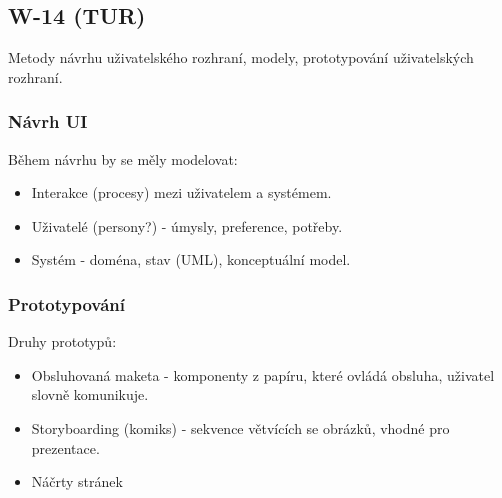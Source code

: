 \subsection{W-14 (TUR)}
Metody návrhu uživatelského rozhraní, modely, prototypování uživatelských rozhraní.

\subsubsection*{Návrh UI}

Během návrhu by se měly modelovat:
\begin{itemize}
  \item Interakce (procesy) mezi uživatelem a systémem. 
  \item Uživatelé (persony?) - úmysly, preference, potřeby.
  \item Systém - doména, stav (UML), konceptuální model.
\end{itemize}

\subsubsection*{Prototypování}

Druhy prototypů:
\begin{itemize}
  \item Obsluhovaná maketa - komponenty z papíru, které ovládá obsluha, uživatel slovně komunikuje.
  \item Storyboarding (komiks) - sekvence větvících se obrázků, vhodné pro prezentace.
  \item Náčrty stránek
\end{itemize}
